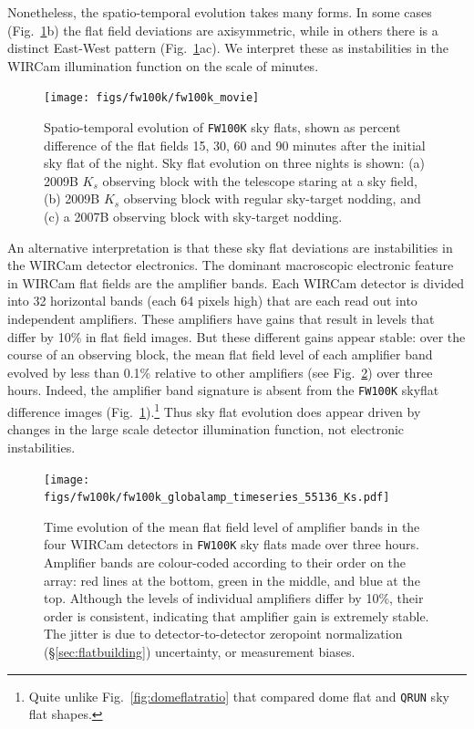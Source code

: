 \documentclass[iop]{emulateapj}
\newcommand{\Fig}[1]{Fig.~\ref{fig:#1}}  %
\newcommand{\Sec}[1]{\S\ref{sec:#1}}  %
\begin{document}
Nonetheless, the spatio-temporal evolution takes many forms.
In some cases (\Fig{fw100k_movie}b) the flat field deviations are axisymmetric, while in others there is a distinct East-West pattern (\Fig{fw100k_movie}ac).
We interpret these as instabilities in the WIRCam illumination function on the scale of minutes.

\begin{figure}[t]
\centering
\texttt{[image: figs/fw100k/fw100k\_movie]}
\caption{Spatio-temporal evolution of \texttt{FW100K} sky flats, shown as percent difference of the flat fields 15, 30, 60 and 90 minutes after the initial sky flat of the night.
Sky flat evolution on three nights is shown: (a) 2009B $K_s$ observing block with the telescope staring at a sky field, (b) 2009B $K_s$ observing block with regular sky-target nodding, and (c) a 2007B observing block with sky-target nodding.}
\label{fig:fw100k_movie}
\end{figure}

An alternative interpretation is that these sky flat deviations are instabilities in the WIRCam detector electronics.
The dominant macroscopic electronic feature in WIRCam flat fields are the amplifier bands.
Each WIRCam detector is divided into 32 horizontal bands (each 64 pixels high) that are each read out into independent amplifiers.
These amplifiers have gains that result in levels that differ by 10\% in flat field images.
But these different gains appear stable: over the course of an observing block, the mean flat field level of each amplifier band evolved by less than 0.1\% relative to other amplifiers (see \Fig{fw100k_globalamp_timeseries_55136_Ks}) over three hours.
Indeed, the amplifier band signature is absent from the \texttt{FW100K} skyflat difference images (\Fig{fw100k_movie}).\footnote{Quite unlike \Fig{domeflatratio} that compared dome flat and \texttt{QRUN} sky flat shapes.}
Thus sky flat evolution does appear driven by changes in the large scale detector illumination function, not electronic instabilities.

\begin{figure}[t]
\centering
\texttt{[image: figs/fw100k/fw100k\_globalamp\_timeseries\_55136\_Ks.pdf]}
\caption{Time evolution of the mean flat field level of amplifier bands in the four WIRCam detectors in \texttt{FW100K} sky flats made over three hours.
Amplifier bands are colour-coded according to their order on the array: red lines at the bottom, green in the middle, and blue at the top.
Although the levels of individual amplifiers differ by 10\%, their order is consistent, indicating that amplifier gain is extremely stable.
The jitter is due to detector-to-detector zeropoint normalization (\Sec{flatbuilding}) uncertainty, or measurement biases.}
\label{fig:fw100k_globalamp_timeseries_55136_Ks}
\end{figure}
\end{document}
